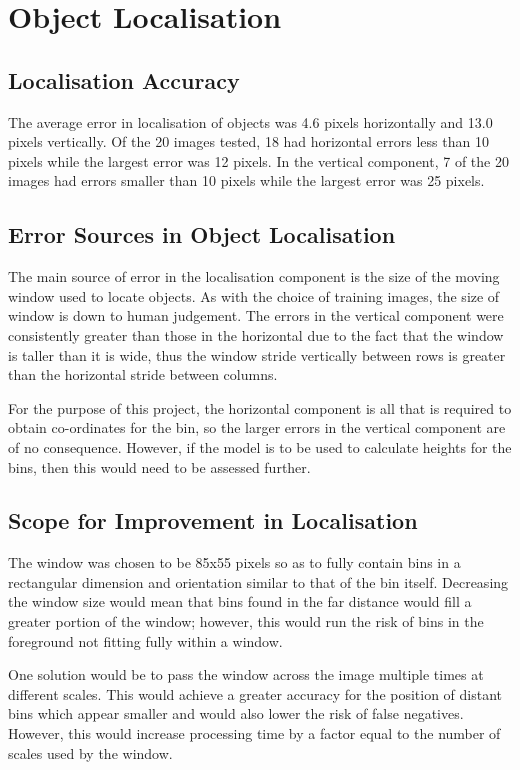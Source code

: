 \section{Object Localisation}

\subsection{Localisation Accuracy} \label{local_accuracy}
The average error in localisation of objects was 4.6 pixels horizontally and 13.0 pixels vertically. Of the 20 images tested, 18 had horizontal errors less than 10 pixels while the largest error was 12 pixels. In the vertical component, 7 of the 20 images had errors smaller than 10 pixels while the largest error was 25 pixels.

\subsection{Error Sources in Object Localisation}
The main source of error in the localisation component is the size of the moving window used to locate objects. As with the choice of training images, the size of window is down to human judgement. The errors in the vertical component were consistently greater than those in the horizontal due to the fact that the window is taller than it is wide, thus the window stride vertically between rows is greater than the horizontal stride between columns.

For the purpose of this project, the horizontal component is all that is required to obtain co-ordinates for the bin, so the larger errors in the vertical component are of no consequence. However, if the model is to be used to calculate heights for the bins, then this would need to be assessed further.

\subsection{Scope for Improvement in Localisation}
The window was chosen to be 85x55 pixels so as to fully contain bins in a rectangular dimension and orientation similar to that of the bin itself. Decreasing the window size would mean that bins found in the far distance would fill a greater portion of the window; however, this would run the risk of bins in the foreground not fitting fully within a window.

One solution would be to pass the window across the image multiple times at different scales. This would achieve a greater accuracy for the position of distant bins which appear smaller and would also lower the risk of false negatives. However, this would increase processing time by a factor equal to the number of scales used by the window.

